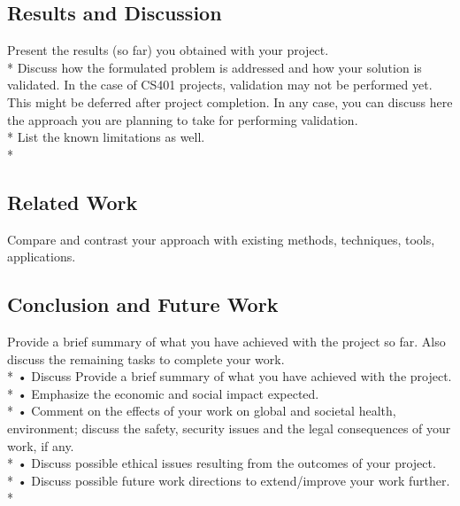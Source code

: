 \documentclass{article}
\begin{document}
\begin{center}
    \section{Results and Discussion}
\end{center}
Present the results (so far) you obtained with your project.\vspace{0.1cm} \\*
Discuss how the formulated problem is addressed and how your solution is validated. In the case of CS401 projects, validation may not be performed yet. This might be deferred after project completion. In any case, you can discuss here the approach you are planning to take for performing validation. \vspace{0.1cm} \\*
List the known limitations as well.\\*

\begin{center}
    \section{Related Work}
\end{center}
Compare and contrast your approach with existing methods, techniques, tools, applications.

\begin{center}
    \section{Conclusion and Future Work}
\end{center}
Provide a brief summary of what you have achieved with the project so far. Also discuss the remaining tasks to complete your work. \vspace{0.1cm}\\*
• Discuss Provide a brief summary of what you have achieved with the project.\\*
• Emphasize the economic and social impact expected.\\*
• Comment on the effects of your work on global and societal health, environment; discuss the safety, security issues and the legal consequences of your work, if any.\\*
• Discuss possible ethical issues resulting from the outcomes of your project.\\*
• Discuss possible future work directions to extend/improve your work further.\\*
\end{document}
